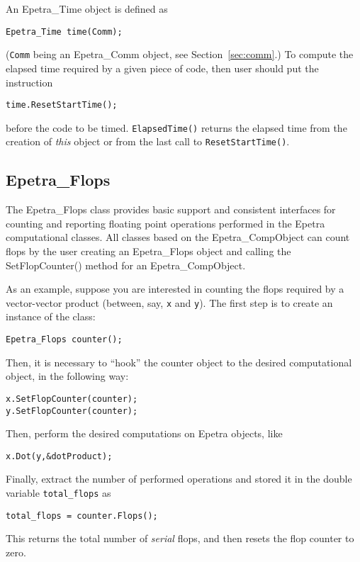 An Epetra\_Time object is defined as
\begin{verbatim}
Epetra_Time time(Comm);
\end{verbatim}
(\verb!Comm! being an Epetra\_Comm object, see Section~\ref{sec:comm}.)
To compute the elapsed time required by a given piece of code, then user
should put the instruction
\begin{verbatim}
time.ResetStartTime();
\end{verbatim}
before the code to be timed. \verb!ElapsedTime()!  returns the elapsed
time from the creation of {\sl this} object or from the last call to
\verb!ResetStartTime()!.


\subsection{Epetra\_Flops}
\label{sec:flops}

The Epetra\_Flops class provides basic support and consistent interfaces
for counting and reporting floating point operations performed in the
Epetra computational classes. All classes based on the
Epetra\_CompObject can count flops by the user creating an Epetra\_Flops
object and calling the SetFlopCounter() method for an
Epetra\_CompObject.

As an example, suppose you are interested in counting the flops required
by a vector-vector product (between, say, \verb!x! and \verb!y!).  The
first step is to create an instance of the class:
\begin{verbatim}
Epetra_Flops counter();
\end{verbatim}
Then, it is necessary to ``hook'' the counter object to the desired
computational object, in the following way:
\begin{verbatim}
x.SetFlopCounter(counter);
y.SetFlopCounter(counter);
\end{verbatim}
Then, perform the desired computations on Epetra objects, like
\begin{verbatim}
x.Dot(y,&dotProduct);
\end{verbatim}
Finally, extract the number of performed operations and stored it in the
double variable \verb!total_flops! as
\begin{verbatim}
total_flops = counter.Flops();
\end{verbatim}
This returns the total number of {\sl serial} flops, and then resets the
flop counter to zero.


